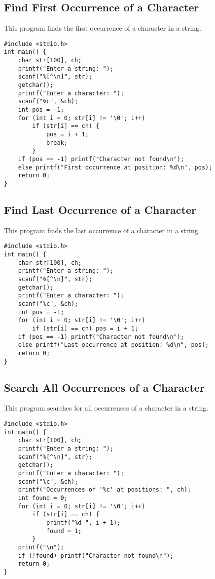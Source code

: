\documentclass[a4paper,12pt]{article}
\begin{document}
\subsection{Find First Occurrence of a Character}
This program finds the first occurrence of a character in a string.
\begin{lstlisting}[caption={Find First Occurrence of a Character}]
#include <stdio.h>
int main() {
    char str[100], ch;
    printf("Enter a string: ");
    scanf("%[^\n]", str);
    getchar();
    printf("Enter a character: ");
    scanf("%c", &ch);
    int pos = -1;
    for (int i = 0; str[i] != '\0'; i++)
        if (str[i] == ch) {
            pos = i + 1;
            break;
        }
    if (pos == -1) printf("Character not found\n");
    else printf("First occurrence at position: %d\n", pos);
    return 0;
}
\end{lstlisting}
\clearpage

\subsection{Find Last Occurrence of a Character}
This program finds the last occurrence of a character in a string.
\begin{lstlisting}[caption={Find Last Occurrence of a Character}]
#include <stdio.h>
int main() {
    char str[100], ch;
    printf("Enter a string: ");
    scanf("%[^\n]", str);
    getchar();
    printf("Enter a character: ");
    scanf("%c", &ch);
    int pos = -1;
    for (int i = 0; str[i] != '\0'; i++)
        if (str[i] == ch) pos = i + 1;
    if (pos == -1) printf("Character not found\n");
    else printf("Last occurrence at position: %d\n", pos);
    return 0;
}
\end{lstlisting}
\clearpage

\subsection{Search All Occurrences of a Character}
This program searches for all occurrences of a character in a string.
\begin{lstlisting}[caption={Search All Occurrences of a Character}]
#include <stdio.h>
int main() {
    char str[100], ch;
    printf("Enter a string: ");
    scanf("%[^\n]", str);
    getchar();
    printf("Enter a character: ");
    scanf("%c", &ch);
    printf("Occurrences of '%c' at positions: ", ch);
    int found = 0;
    for (int i = 0; str[i] != '\0'; i++)
        if (str[i] == ch) {
            printf("%d ", i + 1);
            found = 1;
        }
    printf("\n");
    if (!found) printf("Character not found\n");
    return 0;
}
\end{lstlisting}
\clearpage
\end{document}
